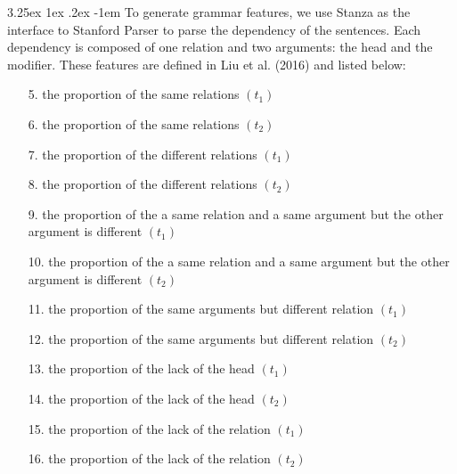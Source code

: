 \documentclass[12pt]{article}
\makeatletter
\newcounter{subsubsubsection}[subsubsection]
\renewcommand\paragraph{\@startsection{paragraph}{5}{\z@}%
  {3.25ex \@plus1ex \@minus.2ex}%
  {-1em}%
  {\normalfont\normalsize\bfseries}}
\makeatother
\begin{document}
\begin{CJK*}{UTF8}{bkai}
\begin{spacing}{1.77}
\paragraph{}
To generate grammar features, we use Stanza\cite{qi2020stanza} as the interface to Stanford Parser to parse the dependency of the sentences. Each dependency is composed of one relation and two arguments: the head and the modifier. These features are defined in Liu et al. (2016) and listed below:

\begin{enumerate}
    \item[ 5.] the proportion of the same relations $(t_1)$
    \item[ 6.] the proportion of the same relations $(t_2)$
    \item[ 7.] the proportion of the different relations $(t_1)$
    \item[ 8.] the proportion of the different relations $(t_2)$
    \item[ 9.] the proportion of the a same relation and a same argument but the other argument is different $(t_1)$
    \item[10.] the proportion of the a same relation and a same argument but the other argument is different $(t_2)$
    \item[11.] the proportion of the same arguments but different relation $(t_1)$
    \item[12.] the proportion of the same arguments but different relation $(t_2)$
    \item[13.] the proportion of the lack of the head $(t_1)$
    \item[14.] the proportion of the lack of the head $(t_2)$
    \item[15.] the proportion of the lack of the relation $(t_1)$
    \item[16.] the proportion of the lack of the relation $(t_2)$
\end{enumerate}



\end{spacing}
\end{CJK*}
\end{document}
